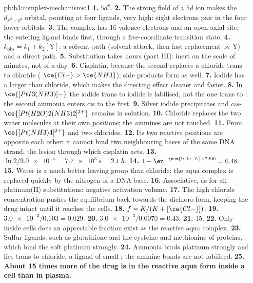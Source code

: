 \begin{solution}{pb:b3:complex-mechanisms:1}
\textbf{1.} $5d^8$.
\textbf{2.} The strong field of a $5d$ ion makes the $d_{x^2-y^2}$ orbital, pointing at four
ligands, very high: eight electrons pair in the four lower orbitals.
\textbf{3.} The complex has 16 valence electrons and an open axial site: the entering
ligand binds first, through a five-coordinate transition state.
\textbf{4.} $k_{\mathrm{obs}} = k_1 + k_2[\mathrm Y]$: a solvent path (solvent attack, then fast replacement by Y)
and a direct path.
\textbf{5.} Substitution takes hours (part III): inert on the scale of minutes, not of
a day.
\textbf{6.} Cisplatin, because the second  replaces a chloride trans to chloride
( $\ce{Cl-} > \ce{NH3}$); side products form as well.
\textbf{7.} Iodide has a larger  than chloride, which makes the directing
effect cleaner and faster.
\textbf{8.} In $\ce{[PtI3(NH3)]-}$ the iodide trans to iodide is labilised, not the one trans to
: the second ammonia enters cis to the first.
\textbf{9.} Silver iodide precipitates and $cis$-$\ce{[Pt(H2O)2(NH3)2]^{2+}}$ remains in solution.
\textbf{10.} Chloride replaces the two water molecules at their own positions; the
ammines are not touched.
\textbf{11.} From $\ce{[Pt(NH3)4]^{2+}}$ and two chlorides.
\textbf{12.} Its two reactive positions are opposite each other: it cannot bind two
neighbouring bases of the same DNA strand, the lesion through which cisplatin
acts.
\textbf{13.} $\ln2/\num{9.0e-5} = \qty{7.7e3}{s} = \qty{2.1}{h}$.
\textbf{14.} $1 - \eu^{-\num{9.0e-5} \times 7200} = 0.48$.
\textbf{15.} Water is a much better leaving group than chloride: the aqua complex is
replaced quickly by the nitrogen of a DNA base.
\textbf{16.} Associative, as for all platinum(II) substitutions: negative activation
volume.
\textbf{17.} The high chloride concentration pushes the equilibrium back towards the
dichloro form, keeping the drug intact until it reaches the cells.
\textbf{18.} $f = K/(K + [\ce{Cl-}])$.
\textbf{19.} $\num{3.0e-3}/0.103 = 0.029$.
\textbf{20.} $\num{3.0e-3}/0.0070 = 0.43$.
\textbf{21.} 15.
\textbf{22.} Only inside cells does an appreciable fraction exist as the reactive aqua
complex.
\textbf{23.} Sulfur ligands, such as glutathione and the cysteine and methionine of
proteins, which bind the soft platinum strongly.
\textbf{24.} Ammonia binds platinum strongly and lies trans to chloride, a ligand of
small : the ammine bonds are not labilised.
\textbf{25.} \textbf{About 15 times more of the drug is in the reactive aqua form inside a
cell than in plasma.}
\end{solution}
